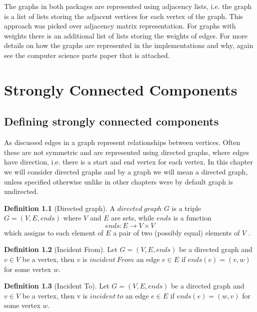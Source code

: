 \documentclass{report}
\theoremstyle{plain}
\theoremstyle{definition}
\newtheorem{definition}{Definition}
\theoremstyle{remark}
\numberwithin{definition}{chapter}
\numberwithin{example}{chapter}
\numberwithin{figure}{chapter}
\numberwithin{theorem}{chapter}
\numberwithin{lemma}{chapter}
\begin{document}
The graphs in both packages are represented using adjacency lists, i.e. the graph is a list of lists storing the adjacent vertices for each vertex of the graph. This approach was picked over adjacency matrix representation. For graphs with weights there is an additional list of lists storing the weights of edges. For more details on how the graphs are represented in the implementations and why, again see the computer science parts paper that is attached.

\chapter{Strongly Connected Components}

\section{Defining strongly connected components}

As discussed edges in a graph represent relationships between vertices. Often these are not symmetric and are represented using directed graphs, where edges have direction, i.e. there is a start and end vertex for each vertex. In this chapter we will consider directed graphs and by a graph we will mean a directed graph, unless specified otherwise unlike in other chapters were by default graph is undirected.

\begin{definition}[Directed graph]
A $directed \ graph$  $G$ is a triple $G = (V, E, ends)$ where $V$ and $E$ are sets, while $ends$ is a function 
  \begin{equation}
  ends:E\to V \times V
  \end{equation}
which assigns to each element of $E$ a pair of two (possibly equal) elements of $V$ .
\end{definition}

\begin{definition}[Incident From]
Let $G = (V, E, ends)$ be a directed graph and $v \in V$ be a vertex, then $v$ is $incident \ From$ an edge $e \in E$ if $ends(e)=(v, w)$ for some vertex $w$.
\end{definition}

\begin{definition}[Incident To]
Let $G = (V, E, ends)$ be a directed graph and $v \in V$ be a vertex, then v is $incident \ to$ an edge $e \in E$ if $ends(e)=(w, v)$ for some vertex $w$.
\end{definition}
\end{document}
